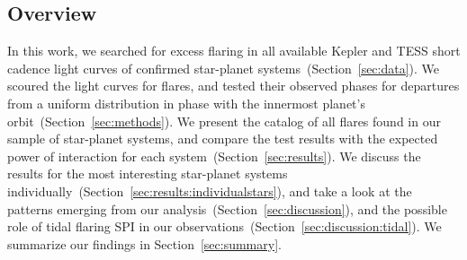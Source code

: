 \documentclass[twocolumn]{aastex631}
\begin{document}
\subsection{Overview}
In this work, we searched for excess flaring in all available Kepler and TESS short cadence light curves of confirmed star-planet systems~(Section~\ref{sec:data}). We scoured the light curves for flares, and tested their observed phases for departures from a uniform distribution in phase with the innermost planet's orbit~(Section~\ref{sec:methods}). We present the catalog of all flares found in our sample of star-planet systems, and compare the test results with the expected power of interaction for each system~(Section~\ref{sec:results}). We discuss the results for the most interesting star-planet systems individually~(Section~\ref{sec:results:individualstars}), and take a look at the patterns emerging from our analysis~(Section~\ref{sec:discussion}), and the possible role of tidal flaring SPI in our observations~(Section~\ref{sec:discussion:tidal}).  We summarize our findings in Section~\ref{sec:summary}. 








\end{document}
